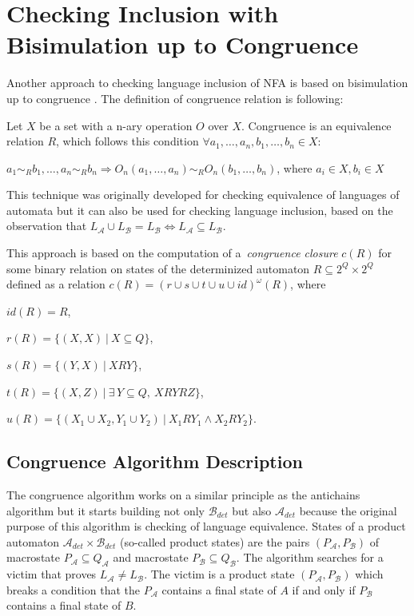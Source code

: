 \section{Checking Inclusion with Bisimulation up to Congruence}
\label{sectionCongr}
Another approach to checking language inclusion of NFA is based on bisimulation up to congruence \cite{popl13}. The definition of congruence relation is
following:

	Let $X$ be a set with a n-ary operation $O$ over $X$. Congruence is an equivalence relation $R$, 
	which follows this condition $\forall a_1,\ldots,a_n,b_1,\ldots,b_n\in X$:
		\begin{description}
			\item $a_1 \sim_{R} b_1,\ldots,a_n \sim_{R} b_n \Rightarrow O_n(a_1,\ldots,a_n) \sim_{R} O_n(b_1,\ldots,b_n)$, where $a_i \in X, b_i \in X$
		\end{description}

This technique was originally developed for checking equivalence of languages of automata but it can
also be used for checking language inclusion, based on the observation that $L_\mathcal{A}\cup L_\mathcal{B}= L_\mathcal{B} 
\Leftrightarrow L_\mathcal{A}\subseteq L_\mathcal{B}$.

  This approach is based on the computation of a~\emph{congruence closure} $c(R)$ 
  for some binary relation on states of the determinized automaton $R \subseteq 2^Q\times 2^Q$ defined 
  as a relation $c(R)=(r\cup s\cup t \cup u\cup id)^{\omega}(R)$, where
  \begin{description}
  \item $id(R)=R$, 
  \item $r(R)=\{(X,X)\ |\ X\subseteq Q\}$, 
  \item $s(R)=\{(Y,X)\ |\ XRY\}$,
  \item $t(R)=\{(X,Z)\ |\ \exists\,Y\subseteq Q,\ XRYRZ\}$,
  \item $u(R)=\{(X_1 \cup X_2,Y_1\cup Y_2)\ |\ X_1 R Y_1 \wedge X_2 R Y_2\}$. 
  \end{description}



 \subsection{Congruence Algorithm Description}
\label{subsectCongr}
The congruence algorithm works on a similar principle as the antichains algorithm but 
it starts building not only $\mathcal{B}_{det}$ but also $\mathcal{A}_{det}$ because the original purpose of this algorithm is checking of 
language equivalence. States of a product automaton $\mathcal{A}_{det} \times \mathcal{B}_{det}$  (so-called product states) are the pairs 
$(P_\mathcal{A},P_\mathcal{B})$ of macrostate $P_\mathcal{A} \subseteq Q_\mathcal{A}$ and macrostate
$P_\mathcal{B} \subseteq Q_\mathcal{B}$. 
The algorithm searches for a victim that proves $L_\mathcal{A} \neq L_\mathcal{B}$. The victim is a product state $(P_\mathcal{A},P_\mathcal{B})$ 
which breaks a condition that
the $P_\mathcal{A}$ contains a final state of $A$ if and only if $P_\mathcal{B}$ contains a final state of $B$. 

